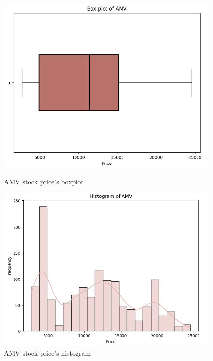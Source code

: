 \documentclass{ieeeojies}
\begin{document}
\begin{figure}[H]
    \centering
    \begin{minipage}{0.23\textwidth}
    \centering
    \includegraphics[width=1\textwidth]{bibliography/Figure/AMVboxplot.png}
    \caption{AMV stock price's boxplot}
    \label{fig:1}
    \end{minipage}
    \hfill
    \begin{minipage}{0.23\textwidth}
    \centering
    \includegraphics[width=1\textwidth]{bibliography/Figure/AMVhist.png}
    \caption{AMV stock price's histogram}
    \label{fig:2}
    \end{minipage}
\end{figure}
\end{document}
